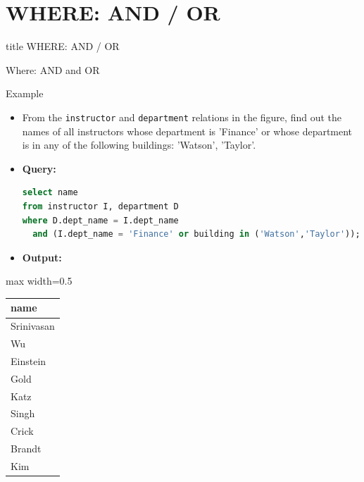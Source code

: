 \documentclass[aspectratio=169, xcolor=dvipsnames]{beamer}
\begin{document}
\section{WHERE: AND / OR}
\begin{frame}
  \vfill
  \centering
  \begin{beamercolorbox}[sep=8pt,center,shadow=true,rounded=true]{title}
    WHERE: AND / OR\par%
  \end{beamercolorbox}
  \vfill
\end{frame}

\begin{frame}[fragile]{Where: AND and OR}
    \begin{exampleblock}{Example}
        \begin{itemize}[<+->]
            \item From the \texttt{instructor} and \texttt{department} relations in the figure, find out the names of all instructors whose department is 'Finance' or whose department is in any of the following buildings: 'Watson', 'Taylor'.
            \item \textbf{Query:}
            \begin{lstlisting}[language=SQL, basicstyle=\ttfamily\scriptsize]
select name 
from instructor I, department D 
where D.dept_name = I.dept_name 
  and (I.dept_name = 'Finance' or building in ('Watson','Taylor'));
            \end{lstlisting}
            \item \textbf{Output:}
        \end{itemize}
    \end{exampleblock}
    \begin{center}
        \begin{adjustbox}{max width=0.5\textwidth}
        \begin{tabular}{|l|}
        \hline
        \textbf{name} \\ \hline
        Srinivasan \\ \hline
        Wu \\ \hline
        Einstein \\ \hline
        Gold \\ \hline
        Katz \\ \hline
        Singh \\ \hline
        Crick \\ \hline
        Brandt \\ \hline
        Kim \\ \hline
        \end{tabular}
        \end{adjustbox}
    \end{center}
\end{frame}
\end{document}

